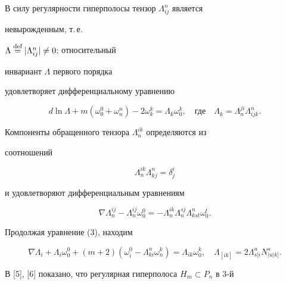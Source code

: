 В силу регулярности гиперполосы тензор $\Lambda^n_{ij}$ является 


невырожденным, т.\,е.


$\Lambda\overset{\text{def}}{=}{}|\Lambda^n_{ij}|\ne 0$; относительный 


инвариант $\Lambda$ первого порядка  


удовлетворяет дифференциальному уравнению 


\begin{equation} 


d\ln\Lambda+m(\omega^0_0+\omega^n_n)-2\omega^k_k= 


\Lambda_k\omega^k_0,\quad


\text{где}


\quad \Lambda_k=\Lambda^{j i}_n\Lambda^n_{ij k}. 


\end{equation} 


Компоненты обращенного тензора $\Lambda^{i k}_n$ определяются из 


соотношений 


\begin{equation} 


\Lambda^{i k}_n\Lambda^n_{k j}=\delta^i_j 


\end{equation} 


и удовлетворяют дифференциальным уравнениям 


\begin{equation} 


\nabla\Lambda^{ij}_n-\Lambda^{ij}_n\omega^0_0= 


-\Lambda^{i k}_n\Lambda^{s j}_n\Lambda^n_{k s t}\omega^t_0. 


\end{equation} 


Продолжая уравнение (3), находим 


\begin{equation} 


\nabla\Lambda_i+\Lambda_i\omega^0_0+(m+2)(\omega^0_i- 


\Lambda^n_{k i}\omega^k_n)=\Lambda_{i k}\omega^k_0,\quad 


\Lambda_{[i k]}=2\Lambda^u_{s[i}N^s_{|u|k]}. 


\end{equation} 


 


В [5], [6] показано, что регулярная гиперполоса $H_m\subset P_n$ в 3-й  


